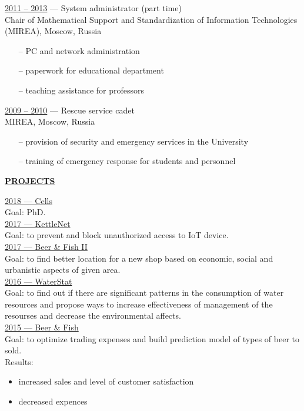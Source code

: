 \documentclass[a4paper,10pt,fullpage]{article}
\begin{document}
\underline{2011 -- 2013} --- System administrator (part time)\\
 Chair of Mathematical Support and Standardization of Information Technologies (MIREA), Moscow, Russia
\begin{itemize}
	\item[--] PC and network administration
	\item[--] paperwork for educational department
	\item[--] teaching assistance for professors\\
\end{itemize}

\underline{2009 -- 2010} --- Rescue service cadet\\
MIREA, Moscow, Russia
\begin{itemize}
	\item[--] provision of security and emergency services in the University
	\item[--] training of emergency response for students and personnel \\
\end{itemize}


\begin{center}
	\underline{\textbf{PROJECTS}}
\end{center}

\underline{2018 --- Cells}\\
Goal: PhD.\\

\underline{2017 --- KettleNet}\\
Goal: to prevent and block unauthorized access to IoT device.\\

\underline{2017 --- Beer \& Fish II}\\
Goal: to find better location for a new shop based on economic, social and 
urbanistic aspects of given area.\\

\underline{2016 --- WaterStat}\\
Goal: to find out if there are significant patterns in the consumption of water 
resources and propose ways to increase effectiveness of management of the 
resourses and decrease the environmental affects.\\

\underline{2015 --- Beer \& Fish}\\
Goal: to optimize trading expenses and build prediction model of types of beer 
to sold.\\
Results:
\begin{itemize}
	\item increased sales and level of customer satisfaction
	\item decreased expences\\
\end{itemize}
\end{document}
